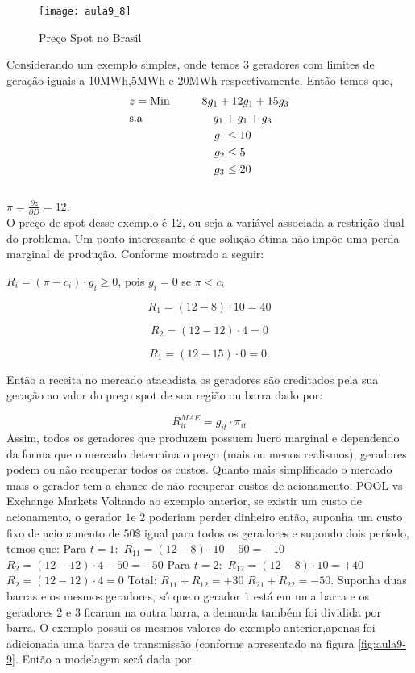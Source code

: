 \begin{figure}[H]
\begin{centering}
\texttt{[image: aula9\_8]}\protect\caption{\label{fig:aula9-8} Preço Spot no Brasil }
\end{centering}
\end{figure}

Considerando um exemplo simples, onde temos 3 geradores com limites de geração iguais a 10MWh,5MWh e 20MWh respectivamente. Então temos que,
\begin{align}
    & z={\text{Min}} \hspace{1cm} 8g_{1}+12g_{1}+15g_{3} \\
    & \text{s.a}  \hspace{2.2cm}   g_{1}+g_{1}+g_{3} \\
    &             \hspace{2.65cm} g_{1}\leq 10 \\
    &             \hspace{2.65cm} g_{2}\leq 5 \\
    &             \hspace{2.65cm} g_{3}\leq 20 \\
\end{align}
\\$\pi=\frac{\partial z}{\partial D}=12.$\\
O preço de spot desse exemplo é 12, ou seja a variável associada a restrição dual do problema.
Um ponto interessante é que solução ótima não impõe uma perda marginal de produção. Conforme mostrado a seguir:

$R_{i}=(\pi-c_{i})\cdot g_{i}\geq0$, pois $g_{i}=0$ se $\pi<c_{i}$

$$R_{1}=(12-8)\cdot10=40$$

$$R_{2}=(12-12)\cdot4=0$$

$$R_{1}=(12-15)\cdot0=0.$$


Então a receita no mercado atacadista os geradores são creditados pela sua geração ao valor do preço spot de sua região ou barra dado por:

$$R_{it}^{MAE}=g_{it}\cdot\pi_{it}$$
 Assim, todos os geradores que produzem possuem lucro marginal e dependendo da forma que o mercado determina o preço (mais ou menos realismos), geradores podem ou não recuperar todos os custos. Quanto mais simplificado o mercado mais o gerador tem a chance de
não recuperar custos de acionamento. POOL vs Exchange Markets
Voltando ao exemplo anterior, se existir um custo de acionamento, o gerador
$1$e $2$ poderiam perder dinheiro então, suponha um custo fixo de acionamento de $50\$$ igual para todos os geradores e supondo dois período, temos que:
Para $t=1:$ $R_{11}=(12-8)\cdot10-50=-10$ $R_{2}=(12-12)\cdot4-50=-50$
Para $t=2:$ $R_{12}=(12-8)\cdot10=+40$ $R_{2}=(12-12)\cdot4=0$
Total: $R_{11}+R_{12}=+30$ $R_{21}+R_{22}=-50.$
Suponha duas barras e os mesmos geradores, só que o gerador 1 está em uma barra e os geradores 2 e 3 ficaram na outra barra, a demanda também foi dividida por barra. O exemplo possui os mesmos valores do exemplo anterior,apenas foi adicionada uma barra de transmissão (conforme apresentado na figura \ref{fig:aula9-9}. Então a modelagem será dada por:

